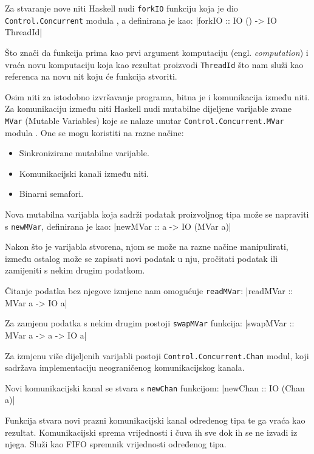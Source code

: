 Za stvaranje nove niti Haskell nudi \texttt{forkIO} funkciju koja
je dio \texttt{Control.Concurrent} modula
\cite{control_concurrent}, a definirana je kao:
|forkIO :: IO () -> IO ThreadId|

Što znači da funkcija prima kao prvi argument komputaciju (engl.
\emph{computation}) i vraća novu komputaciju koja kao rezultat proizvodi
\texttt{ThreadId} što nam služi kao referenca na novu nit koju će
funkcija stvoriti.

Osim niti za istodobno izvršavanje programa, bitna je i komunikacija između niti.
Za komunikaciju između niti Haskell nudi mutabilne dijeljene varijable zvane
\texttt{MVar} (Mutable Variables) koje se nalaze unutar
\texttt{Control.Concurrent.MVar} modula \cite{mvar}. One se mogu
koristiti na razne načine:

\begin{itemize}
\item Sinkronizirane mutabilne varijable.
\item Komunikacijski kanali između niti.
\item Binarni semafori.
\end{itemize}

Nova mutabilna varijabla koja sadrži podatak proizvoljnog tipa može se napraviti
s \texttt{newMVar}, definirana je kao:
|newMVar :: a -> IO (MVar a)|

Nakon što je varijabla stvorena, njom se može na razne načine manipulirati, između
ostalog može se zapisati novi podatak u nju, pročitati podatak ili zamijeniti s
nekim drugim podatkom.

Čitanje podatka bez njegove izmjene nam omogućuje
\texttt{readMVar}:
|readMVar :: MVar a -> IO a|

Za zamjenu podatka s nekim drugim postoji \texttt{swapMVar}
funkcija:
|swapMVar :: MVar a -> a -> IO a|

Za izmjenu više dijeljenih varijabli postoji
\texttt{Control.Concurrent.Chan} \cite{conc.chan} modul, koji
sadržava implementaciju neograničenog komunikacijskog kanala.

Novi komunikacijski kanal se stvara s \texttt{newChan} funkcijom:
|newChan :: IO (Chan a)|

Funkcija stvara novi prazni komunikacijski kanal određenog tipa te ga vraća kao
rezultat. Komunikacijski sprema vrijednosti i čuva ih sve dok ih se ne izvadi iz
njega. Služi kao FIFO spremnik vrijednosti određenog tipa.

